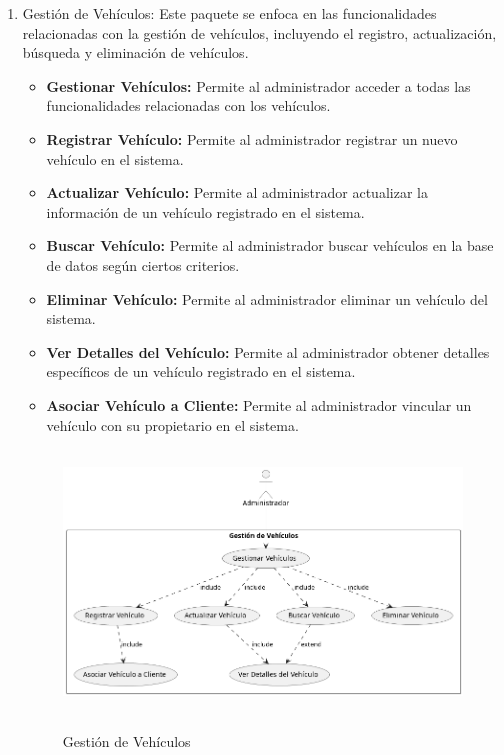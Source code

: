 \begin{enumerate}
	\item Gestión de Vehículos: Este paquete se enfoca en las funcionalidades relacionadas con la gestión de vehículos, incluyendo el registro, actualización, búsqueda y eliminación de vehículos.
	\begin{itemize}
		\item \textbf{Gestionar Vehículos:} Permite al administrador acceder a todas las funcionalidades relacionadas con los vehículos.
		\item \textbf{Registrar Vehículo:} Permite al administrador registrar un nuevo vehículo en el sistema.
		\item \textbf{Actualizar Vehículo:} Permite al administrador actualizar la información de un vehículo registrado en el sistema.
		\item \textbf{Buscar Vehículo:} Permite al administrador buscar vehículos en la base de datos según ciertos criterios.
		\item \textbf{Eliminar Vehículo:} Permite al administrador eliminar un vehículo del sistema.
		\item \textbf{Ver Detalles del Vehículo:} Permite al administrador obtener detalles específicos de un vehículo registrado en el sistema.
		\item \textbf{Asociar Vehículo a Cliente:} Permite al administrador vincular un vehículo con su propietario en el sistema.
	\end{itemize}
	\begin{figure}[H]
		\centering
		\caption{Gestión de Vehículos}
		\includegraphics[width=12cm, height=7cm]{imagenes/cap4/casosUso/GestionVehiculos.png}
		\label{fig:Caso2}
	\end{figure}    
	

\end{enumerate}

